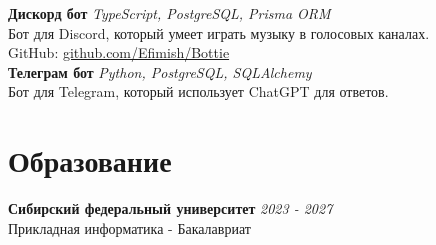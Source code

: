 \documentclass[a4paper, 12pt]{article}
\begin{document}
\textbf{Дискорд бот} \hfill \textit{TypeScript, PostgreSQL, Prisma ORM} \\
Бот для Discord, который умеет играть музыку в голосовых каналах. \\
GitHub: \href{https://github.com/Efimish/Bottie}{github.com/Efimish/Bottie} \\

\textbf{Телеграм бот} \hfill \textit{Python, PostgreSQL, SQLAlchemy} \\
Бот для Telegram, который использует ChatGPT для ответов.

\section{Образование}

\textbf{Сибирский федеральный университет}
\hfill \textit{2023 - 2027} \\
Прикладная информатика - Бакалавриат
\end{document}
